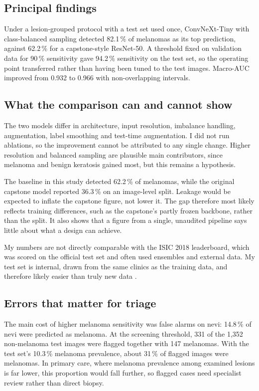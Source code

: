 \documentclass[11pt,a4paper]{article}
\newcommand{\pct}{\,\%}
\begin{document}
\subsection{Principal findings}
Under a lesion-grouped protocol with a test set used once, ConvNeXt-Tiny with class-balanced sampling detected 82.1\pct{} of melanomas as its top prediction, against 62.2\pct{} for a capstone-style ResNet-50. A threshold fixed on validation data for 90\pct{} sensitivity gave 94.2\pct{} sensitivity on the test set, so the operating point transferred rather than having been tuned to the test images. Macro-AUC improved from 0.932 to 0.966 with non-overlapping intervals.

\subsection{What the comparison can and cannot show}
The two models differ in architecture, input resolution, imbalance handling, augmentation, label smoothing and test-time augmentation. I did not run ablations, so the improvement cannot be attributed to any single change. Higher resolution and balanced sampling are plausible main contributors, since melanoma and benign keratosis gained most, but this remains a hypothesis.

The baseline in this study detected 62.2\pct{} of melanomas, while the original capstone model reported 36.3\pct{} on an image-level split. Leakage would be expected to inflate the capstone figure, not lower it. The gap therefore most likely reflects training differences, such as the capstone's partly frozen backbone, rather than the split. It also shows that a figure from a single, unaudited pipeline says little about what a design can achieve.

My numbers are not directly comparable with the ISIC 2018 leaderboard, which was scored on the official test set and often used ensembles and external data. My test set is internal, drawn from the same clinics as the training data, and therefore likely easier than truly new data \cite{tschandl2019}.

\subsection{Errors that matter for triage}
The main cost of higher melanoma sensitivity was false alarms on nevi: 14.8\pct{} of nevi were predicted as melanoma. At the screening threshold, 331 of the 1,352 non-melanoma test images were flagged together with 147 melanomas. With the test set's 10.3\pct{} melanoma prevalence, about 31\pct{} of flagged images were melanomas. In primary care, where melanoma prevalence among examined lesions is far lower, this proportion would fall further, so flagged cases need specialist review rather than direct biopsy.
\end{document}
